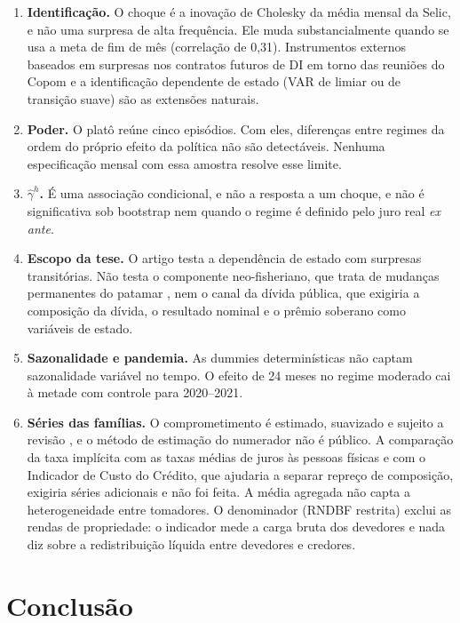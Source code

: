 \documentclass[12pt,a4paper]{article}
\begin{document}
\begin{enumerate}
    \item \textbf{Identificação.} O choque é a inovação de Cholesky da média mensal da Selic, e não uma surpresa de alta frequência. Ele muda substancialmente quando se usa a meta de fim de mês (correlação de 0,31). Instrumentos externos baseados em surpresas nos contratos futuros de DI em torno das reuniões do Copom e a identificação dependente de estado (VAR de limiar ou de transição suave) são as extensões naturais.
    \item \textbf{Poder.} O platô reúne cinco episódios. Com eles, diferenças entre regimes da ordem do próprio efeito da política não são detectáveis. Nenhuma especificação mensal com essa amostra resolve esse limite.
    \item \textbf{$\hat{\gamma}^h$.} É uma associação condicional, e não a resposta a um choque, e não é significativa sob bootstrap nem quando o regime é definido pelo juro real \textit{ex ante}.
    \item \textbf{Escopo da tese.} O artigo testa a dependência de estado com surpresas transitórias. Não testa o componente neo-fisheriano, que trata de mudanças permanentes do patamar \citep{uribe2022neo}, nem o canal da dívida pública, que exigiria a composição da dívida, o resultado nominal e o prêmio soberano como variáveis de estado.
    \item \textbf{Sazonalidade e pandemia.} As dummies determinísticas não captam sazonalidade variável no tempo. O efeito de 24 meses no regime moderado cai à metade com controle para 2020--2021.
    \item \textbf{Séries das famílias.} O comprometimento é estimado, suavizado e sujeito a revisão \citep{bcb2021nt55}, e o método de estimação do numerador não é público. A comparação da taxa implícita com as taxas médias de juros às pessoas físicas e com o Indicador de Custo do Crédito, que ajudaria a separar repreço de composição, exigiria séries adicionais e não foi feita. A média agregada não capta a heterogeneidade entre tomadores. O denominador (RNDBF restrita) exclui as rendas de propriedade: o indicador mede a carga bruta dos devedores e nada diz sobre a redistribuição líquida entre devedores e credores.
\end{enumerate}

\section{Conclusão}
\end{document}
